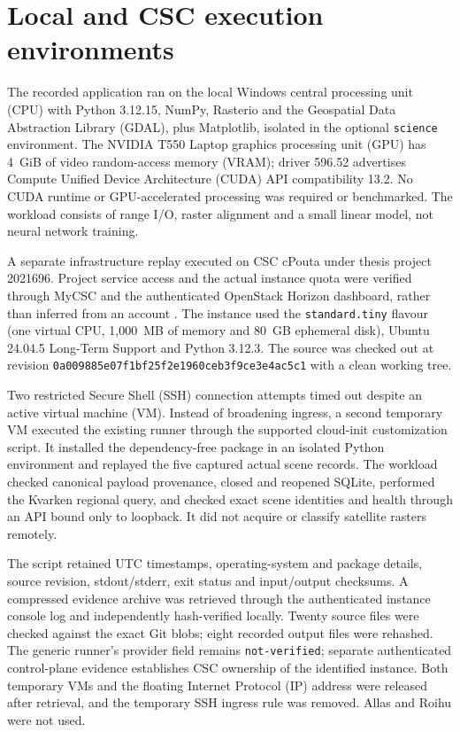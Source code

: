 \section{Local and CSC execution environments}

The recorded application ran on the local Windows central processing unit (CPU) with
Python 3.12.15, NumPy, Rasterio and the Geospatial Data Abstraction Library (GDAL), plus
Matplotlib, isolated in the optional \texttt{science} environment. The NVIDIA T550 Laptop
graphics processing unit (GPU) has 4~GiB of video random-access memory (VRAM); driver
596.52 advertises Compute Unified Device Architecture (CUDA) API compatibility
13.2. No CUDA runtime or GPU-accelerated processing was required or benchmarked.
The workload consists of range I/O, raster alignment and a small linear model, not neural
network training.

A separate infrastructure replay executed on CSC cPouta under thesis project 2021696.
Project service access and the actual instance quota were verified through MyCSC and
the authenticated OpenStack Horizon dashboard, rather than inferred from an account
\citep{csc-access,csc-pouta}. The instance used the \texttt{standard.tiny} flavour
(one virtual CPU, 1,000~MB of memory and 80~GB ephemeral disk), Ubuntu 24.04.5 Long-Term
Support and Python 3.12.3.
The source was checked out at revision
\nolinkurl{0a009885e07f1bf25f2e1960ceb3f9ce3e4ac5c1} with a clean working tree.

Two restricted Secure Shell (SSH) connection attempts timed out despite an active
virtual machine (VM). Instead of broadening ingress, a second temporary VM executed the existing runner through the
supported cloud-init customization script. It installed the dependency-free package
in an isolated Python environment and replayed the five captured actual scene records.
The workload checked canonical payload provenance, closed and reopened SQLite, performed
the Kvarken regional query, and checked exact scene identities and health through an
API bound only to loopback. It did not acquire or classify satellite rasters remotely.

The script retained UTC timestamps, operating-system and package details, source revision,
stdout/stderr, exit status and input/output checksums. A compressed evidence archive was
retrieved through the authenticated instance console log and independently hash-verified
locally. Twenty source files were checked against the exact Git blobs; eight recorded
output files were rehashed. The generic runner's provider field remains
\texttt{not-verified}; separate authenticated control-plane evidence establishes CSC
ownership of the identified instance. Both temporary VMs and the floating Internet Protocol
(IP) address were
released after retrieval, and the temporary SSH ingress rule was removed. Allas and
Roihu were not used.
